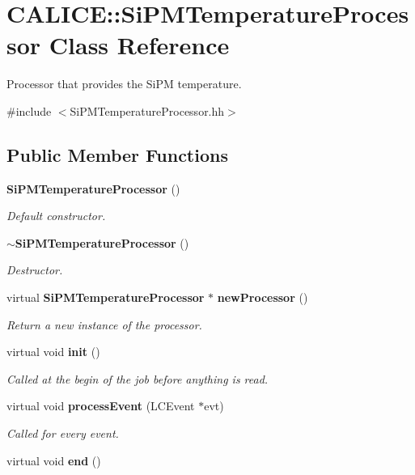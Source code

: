 \section{CALICE::SiPMTemperatureProcessor Class Reference}
\label{classCALICE_1_1SiPMTemperatureProcessor}


Processor that provides the SiPM temperature.  


{\ttfamily \#include $<$SiPMTemperatureProcessor.hh$>$}\subsection*{Public Member Functions}
\begin{DoxyCompactItemize}
\item 
{\bf SiPMTemperatureProcessor} ()\label{classCALICE_1_1SiPMTemperatureProcessor_a04ac0bf7f828c454fb8dada5710e5106}

\begin{DoxyCompactList}\small\item\em Default constructor. \item\end{DoxyCompactList}\item 
{\bf $\sim$SiPMTemperatureProcessor} ()\label{classCALICE_1_1SiPMTemperatureProcessor_ac484602a86c82558880b3ebc1f62dc77}

\begin{DoxyCompactList}\small\item\em Destructor. \item\end{DoxyCompactList}\item 
virtual {\bf SiPMTemperatureProcessor} $\ast$ {\bf newProcessor} ()\label{classCALICE_1_1SiPMTemperatureProcessor_ad65bd44b3ce6be3260e57c1fcb75dcba}

\begin{DoxyCompactList}\small\item\em Return a new instance of the processor. \item\end{DoxyCompactList}\item 
virtual void {\bf init} ()\label{classCALICE_1_1SiPMTemperatureProcessor_a900fb4beaa66160686582a75c7fe2968}

\begin{DoxyCompactList}\small\item\em Called at the begin of the job before anything is read. \item\end{DoxyCompactList}\item 
virtual void {\bf processEvent} (LCEvent $\ast$evt)
\begin{DoxyCompactList}\small\item\em Called for every event. \item\end{DoxyCompactList}\item 
virtual void {\bf end} ()\label{classCALICE_1_1SiPMTemperatureProcessor_a2cbda0153aeecea1be18a5a1b9eadb65}


\end{DoxyCompactItemize}
